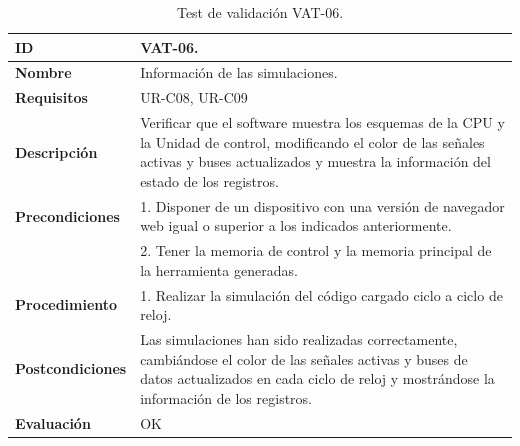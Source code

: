 \begin{center}
\begin{table}[htb]
\centering
\begin{tabular}{@{}p{2.5cm} p{9cm}@{}} 
\toprule
\textbf{ID} 					& VAT-06. \\
\midrule
\textbf{Nombre} 				& Información de las simulaciones. \\
\midrule
\textbf{Requisitos} 		& UR-C08, UR-C09\\
\midrule
\textbf{Descripción} 		& Verificar que el software muestra los esquemas de la CPU y la Unidad de control, modificando el color de las señales activas y buses actualizados y muestra la información del estado de los registros. \\
\midrule
\textbf{Precondiciones}		& 1. Disponer de un dispositivo con una versión de navegador web igual o superior a los indicados anteriormente. \\
											& 2. Tener la memoria de control y la memoria principal de la herramienta generadas. \\
\midrule
\textbf{Procedimiento}		& 1. Realizar la simulación del código cargado ciclo a ciclo de reloj.\\
\midrule
\textbf{Postcondiciones} 		&  Las simulaciones han sido realizadas correctamente, cambiándose el color de las señales activas y buses de datos actualizados en cada ciclo de reloj y mostrándose la información de los registros.\\
\midrule
\textbf{Evaluación} 			& OK \\
\bottomrule
\end{tabular}
\caption{Test de validación VAT-06.}
\label{tab:vat-06}
\end{table}
\end{center}

